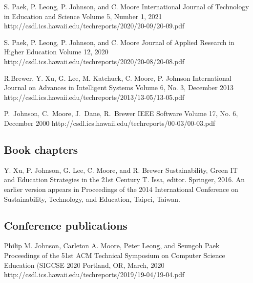 \documentclass[11pt,letterpaper,sans]{moderncv} %
\begin{document}
    {S. Paek, P. Leong, P. Johnson, and C. Moore}
    {International Journal of Technology in Education and Science}
    {Volume 5, Number 1, 2021}
    {http://csdl.ics.hawaii.edu/techreports/2020/20-09/20-09.pdf}

    {S. Paek, P. Leong, P. Johnson, and C. Moore}
    {Journal of Applied Research in Higher Education}
    {Volume 12, 2020}
    {http://csdl.ics.hawaii.edu/techreports/2020/20-08/20-08.pdf}

    {R.Brewer, Y. Xu, G. Lee, M. Katchuck, C. Moore, P. Johnson}
    {International Journal on Advances in Intelligent Systems}
    {Volume 6, No. 3, December 2013}
    {http://csdl.ics.hawaii.edu/techreports/2013/13-05/13-05.pdf}

    {P.~Johnson, C.~Moore, J.~Dane, R.~Brewer}
    {IEEE Software}
    {Volume 17, No. 6, December 2000}
    {http://csdl.ics.hawaii.edu/techreports/00-03/00-03.pdf}

    \subsection{Book chapters}

    {Y. Xu, P. Johnson, G. Lee, C. Moore, and R. Brewer}
    {Sustainability, Green IT and Education Strategies in the 21st Century}
    {T. Issa, editor. Springer, 2016. An earlier version appears in Proceedings of the 2014 International Conference on Sustainability, Technology, and Education, Taipei, Taiwan.}

    \subsection{Conference publications}

    {Philip M. Johnson, Carleton A. Moore, Peter Leong, and Seungoh Paek}
    {Proceedings of the 51st ACM Technical Symposium on Computer Science Education (SIGCSE 2020}
    {Portland, OR, March, 2020}
    {http://csdl.ics.hawaii.edu/techreports/2019/19-04/19-04.pdf}
\end{document}
